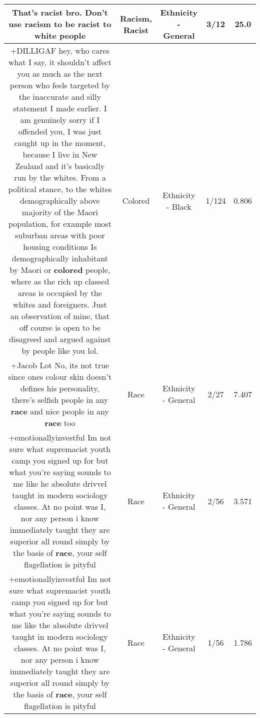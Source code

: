 \documentclass[11pt]{article}
\newlength\mylength
\begin{document}
\begin{center}
\begin{longtable}{|C{.65\mylength}|C{.30\mylength}|C{.12\mylength}|C{.12\mylength}|C{.12\mylength}|}
  \small That's \textbf{racist} bro. Don't use \textbf{racism} to be \textbf{racist} to white people\normalsize   & Racism, Racist & Ethnicity - General & 3/12 & 25.0 \\  \hline
  \small +DILLIGAF hey, who cares what I say, it shouldn't affect you as much as the next person who feels targeted by the inaccurate and silly statement I made earlier. I am genuinely sorry if I offended you, I was just caught up in the moment, because I live in New Zealand and it's basically run by the whites.  From a political stance, to the whites demographically above majority of the Maori population, for example most suburban areas with poor housing conditions Is demographically inhabitant by Maori or \textbf{colored} people, where as the rich up classed areas is occupied by the whites and foreigners. Just an observation of mine, that off course is open to be disagreed and argued against by people like you lol.\normalsize   & Colored & Ethnicity - Black & 1/124 & 0.806 \\  \hline
  \small +Jacob Lot No, its not true since ones colour skin doesn't defines his personality, there's selfish people in any \textbf{race} and nice people in any \textbf{race} too\normalsize   & Race & Ethnicity - General & 2/27 & 7.407 \\  \hline
  \small +emotionallyinvestful Im not sure what supremacist youth camp you signed up for but what you're saying sounds to me like he absolute drivvel taught in modern sociology classes. At no point was I, nor any person i know immediately taught they are superior all round simply by the basis of \textbf{race}, your self flagellation is pityful\normalsize   & Race & Ethnicity - General & 2/56 & 3.571 \\  \hline
  \small +emotionallyinvestful Im not sure what supremacist youth camp you signed up for but what you're saying sounds to me like the absolute drivvel taught in modern sociology classes. At no point was I, nor any person i know immediately taught they are superior all round simply by the basis of \textbf{race}, your self flagellation is pityful\normalsize   & Race & Ethnicity - General & 1/56 & 1.786 \\  \hline

\end{longtable}
\end{center}
\end{document}
